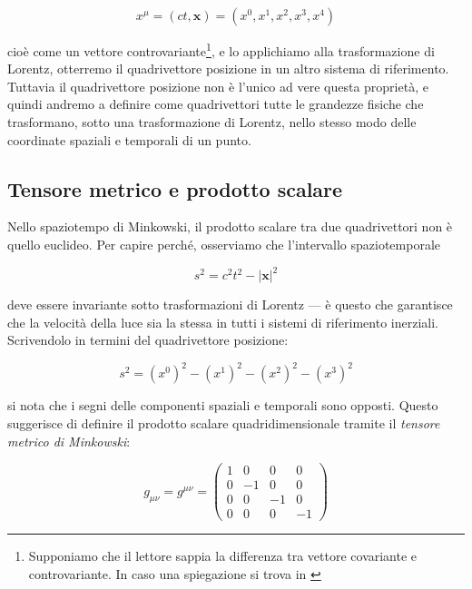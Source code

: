\begin{tcolorbox}[colback=yellow!10!white, colframe=orange!70!black, boxrule=0.8pt]
\begin{equation}
    x^{\mu} = (ct, \mathbf{x}) = (x^0, x^1, x^2, x^3, x^4)
\end{equation}
\end{tcolorbox}

cioè come un vettore controvariante\footnote{Supponiamo che il lettore sappia la differenza tra vettore covariante e controvariante. In caso una spiegazione si trova in \cite{LezioniDiMeccanicaClassica}}, e lo applichiamo alla trasformazione di Lorentz, otterremo il quadrivettore posizione in un altro sistema di riferimento. \\

Tuttavia il quadrivettore posizione non è l'unico ad vere questa proprietà, e quindi andremo a definire come quadrivettori tutte le grandezze fisiche che trasformano, sotto una trasformazione di Lorentz, nello stesso modo delle coordinate spaziali e temporali di un punto. 

\subsection{Tensore metrico e prodotto scalare}

Nello spaziotempo di Minkowski, il prodotto scalare tra due quadrivettori non è quello euclideo. Per capire perché, osserviamo che l'intervallo spaziotemporale

\begin{equation}
    s^2 = c^2t^2 - |\mathbf{x}|^2
\end{equation}

deve essere invariante sotto trasformazioni di Lorentz — è questo che garantisce che la velocità della luce sia la stessa in tutti i sistemi di riferimento inerziali. 
Scrivendolo in termini del quadrivettore posizione:

\begin{equation}
    s^2 = (x^0)^2 - (x^1)^2 - (x^2)^2 - (x^3)^2
\end{equation}

si nota che i segni delle componenti spaziali e temporali sono opposti. Questo suggerisce di definire il prodotto scalare quadridimensionale tramite il \emph{tensore metrico di Minkowski}: 

\begin{tcolorbox}[colback=yellow!10!white, colframe=orange!70!black, boxrule=0.8pt]
\begin{equation}
    g_{\mu\nu} = g^{\mu\nu} = 
    \begin{pmatrix} 
        1 & 0 & 0 & 0 \\ 
        0 & -1 & 0 & 0 \\ 
        0 & 0 & -1 & 0 \\ 
        0 & 0 & 0 & -1 
    \end{pmatrix}
\end{equation}
\end{tcolorbox}

